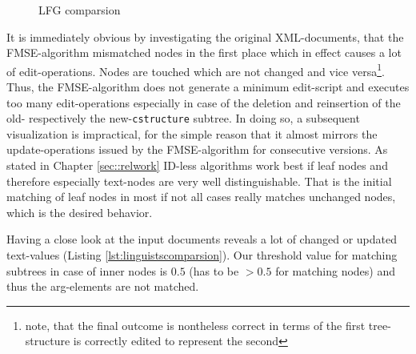 \begin{figure}[tb]
\caption{\label{fig:lfg} LFG comparsion}
\end{figure}

It is immediately obvious by investigating the original XML-documents, that the FMSE-algorithm mismatched nodes in the first place which in effect causes a lot of edit-operations. Nodes are touched which are not changed and vice versa\footnote{note, that the final outcome is nontheless correct in terms of the first tree-structure is correctly edited to represent the second}. Thus, the FMSE-algorithm does not generate a minimum edit-script and executes too many edit-operations especially in case of the deletion and reinsertion of the old- respectively the new-\texttt{cstructure} subtree. In doing so, a subsequent visualization is impractical, for the simple reason that it almost mirrors the update-operations issued by the FMSE-algorithm for consecutive versions. As stated in Chapter \ref{sec::relwork} ID-less algorithms work best if leaf nodes and therefore especially text-nodes are very well distinguishable. That is the initial matching of leaf nodes in most if not all cases really matches unchanged nodes, which is the desired behavior. 

Having a close look at the input documents reveals a lot of changed or updated text-values (Listing \ref{lst:linguistscomparsion}). Our threshold value for matching subtrees in case of inner nodes is $0.5$ (has to be $> 0.5$ for matching nodes) and thus the arg-elements are not matched.

